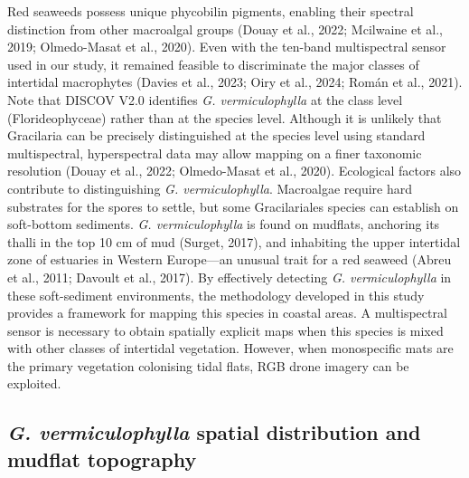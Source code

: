 \documentclass[
  letterpaper,
  DIV=11,
  numbers=noendperiod]{scrartcl}
\begin{document}
Red seaweeds possess unique phycobilin pigments, enabling their spectral
distinction from other macroalgal groups (Douay et al., 2022; Mcilwaine
et al., 2019; Olmedo-Masat et al., 2020). Even with the ten-band
multispectral sensor used in our study, it remained feasible to
discriminate the major classes of intertidal macrophytes (Davies et al.,
2023; Oiry et al., 2024; Román et al., 2021). Note that DISCOV V2.0
identifies \emph{G. vermiculophylla} at the class level
(Florideophyceae) rather than at the species level. Although it is
unlikely that Gracilaria can be precisely distinguished at the species
level using standard multispectral, hyperspectral data may allow mapping
on a finer taxonomic resolution (Douay et al., 2022; Olmedo-Masat et
al., 2020). Ecological factors also contribute to distinguishing
\emph{G. vermiculophylla}. Macroalgae require hard substrates for the
spores to settle, but some Gracilariales species can establish on
soft-bottom sediments. \emph{G. vermiculophylla} is found on mudflats,
anchoring its thalli in the top 10 cm of mud (Surget, 2017), and
inhabiting the upper intertidal zone of estuaries in Western Europe---an
unusual trait for a red seaweed (Abreu et al., 2011; Davoult et al.,
2017). By effectively detecting \emph{G. vermiculophylla} in these
soft-sediment environments, the methodology developed in this study
provides a framework for mapping this species in coastal areas. A
multispectral sensor is necessary to obtain spatially explicit maps when
this species is mixed with other classes of intertidal vegetation.
However, when monospecific mats are the primary vegetation colonising
tidal flats, RGB drone imagery can be exploited.

\subsection{\texorpdfstring{\emph{G. vermiculophylla} spatial
distribution and mudflat
topography}{G. vermiculophylla spatial distribution and mudflat topography}}\label{g.-vermiculophylla-spatial-distribution-and-mudflat-topography}
\end{document}
